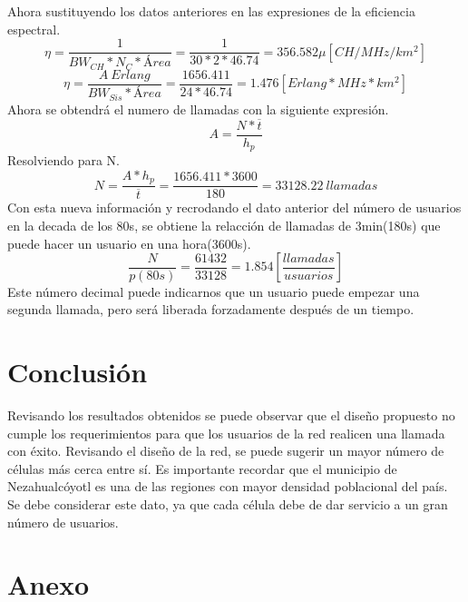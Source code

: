\documentclass[11pt,letterpaper]{article}
\begin{document}
Ahora sustituyendo los datos anteriores en las expresiones de la eficiencia espectral. 
\begin{equation}
    \eta=\frac{1}{BW_{CH}*N_C*Área}=\frac{1}{30*2*46.74}=356.582\mu[CH/MHz/km^2]
\end{equation}
\begin{equation}
    \eta=\frac{A \ Erlang}{BW_{Sis}*Área}=\frac{1656.411}{24*46.74}=1.476 [Erlang*MHz*km^2]
\end{equation}
Ahora se obtendrá el numero de llamadas con la siguiente expresión.
\begin{equation}
    A=\frac{N*\overline{t}}{h_p}
\end{equation}
Resolviendo para N.
\begin{equation}
    N=\frac{A*h_p}{\overline{t}}=\frac{1656.411*3600}{180}=33128.22 \ llamadas
\end{equation}
Con esta nueva información y recrodando el dato anterior del número de usuarios en la decada 
de los 80s, se obtiene la relacción de llamadas de 3min(180s) que puede hacer un usuario en 
una hora(3600s).
\begin{equation}
    \frac{N}{p(80s)}=\frac{61432}{33128}=1.854[\frac{llamadas}{usuarios}]
\end{equation}
Este número decimal puede indicarnos que un usuario puede empezar una segunda llamada, pero será 
liberada forzadamente después de un tiempo.

\section{Conclusión}
Revisando los resultados obtenidos se puede observar que el diseño propuesto no 
cumple los requerimientos para que los usuarios de la red realicen una llamada con 
éxito. Revisando el diseño de la red, se puede sugerir un mayor número de células 
más cerca entre sí. Es importante recordar que el municipio de Nezahualcóyotl es 
una de las regiones con mayor densidad poblacional del país. Se debe considerar 
este dato, ya que cada célula debe de dar servicio a un gran número de usuarios.

\newpage
\section{Anexo}
\end{document}
